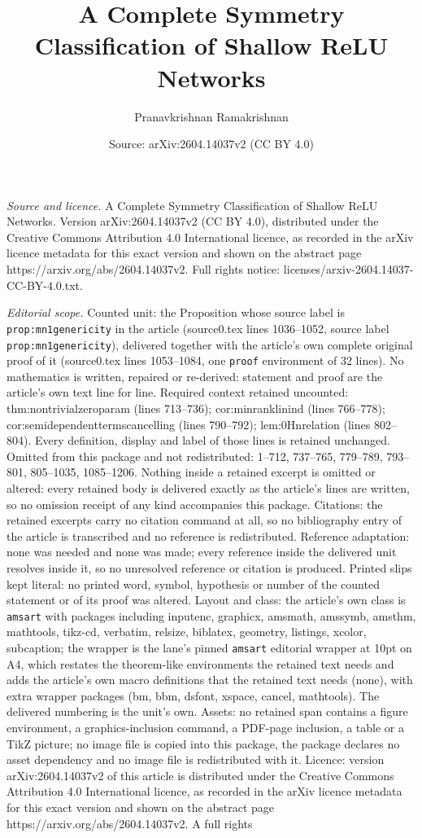 \documentclass[10pt,a4paper]{amsart}
\title[A Complete Symmetry Classification of Shallow ReLU Networks]{A Complete Symmetry Classification of Shallow ReLU Networks}
\author{Pranavkrishnan Ramakrishnan}
\date{Source: arXiv:2604.14037v2 (CC BY 4.0)}
\begin{document}
\maketitle

\noindent\emph{Source and licence.} A Complete Symmetry Classification of Shallow ReLU Networks. Version arXiv:2604.14037v2 (CC BY 4.0), distributed under the Creative Commons Attribution 4.0 International licence, as recorded in the arXiv licence metadata for this exact version and shown on the abstract page https://arxiv.org/abs/2604.14037v2. Full rights notice: licenses/arxiv-2604.14037-CC-BY-4.0.txt.\par\smallskip

\noindent\textit{Editorial scope.} Counted unit: the Proposition whose source label is \texttt{prop:mn1genericity} in the article (source0.tex lines 1036--1052, source label \texttt{prop:mn1genericity}), delivered together with the article's own complete original proof of it (source0.tex lines 1053--1084, one \texttt{proof} environment of 32 lines). No mathematics is written, repaired or re-derived: statement and proof are the article's own text line for line. Required context retained uncounted: thm:nontrivialzeroparam (lines 713--736); cor:minranklinind (lines 766--778); cor:semidependenttermscancelling (lines 790--792); lem:0Hnrelation (lines 802--804). Every definition, display and label of those lines is retained unchanged. Omitted from this package and not redistributed: 1--712, 737--765, 779--789, 793--801, 805--1035, 1085--1206. Nothing inside a retained excerpt is omitted or altered: every retained body is delivered exactly as the article's lines are written, so no omission receipt of any kind accompanies this package. Citations: the retained excerpts carry no citation command at all, so no bibliography entry of the article is transcribed and no reference is redistributed. Reference adaptation: none was needed and none was made; every reference inside the delivered unit resolves inside it, so no unresolved reference or citation is produced. Printed slips kept literal: no printed word, symbol, hypothesis or number of the counted statement or of its proof was altered. Layout and class: the article's own class is \texttt{amsart} with packages including inputenc, graphicx, amsmath, amssymb, amsthm, mathtools, tikz-cd, verbatim, relsize, biblatex, geometry, listings, xcolor, subcaption; the wrapper is the lane's pinned \texttt{amsart} editorial wrapper at 10pt on A4, which restates the theorem-like environments the retained text needs and adds the article's own macro definitions that the retained text needs (none), with extra wrapper packages (bm, bbm, dsfont, xspace, cancel, mathtools). The delivered numbering is the unit's own. Assets: no retained span contains a figure environment, a graphics-inclusion command, a PDF-page inclusion, a table or a TikZ picture; no image file is copied into this package, the package declares no asset dependency and no image file is redistributed with it. Licence: version arXiv:2604.14037v2 of this article is distributed under the Creative Commons Attribution 4.0 International licence, as recorded in the arXiv licence metadata for this exact version and shown on the abstract page https://arxiv.org/abs/2604.14037v2. A full rights 
\end{document}
